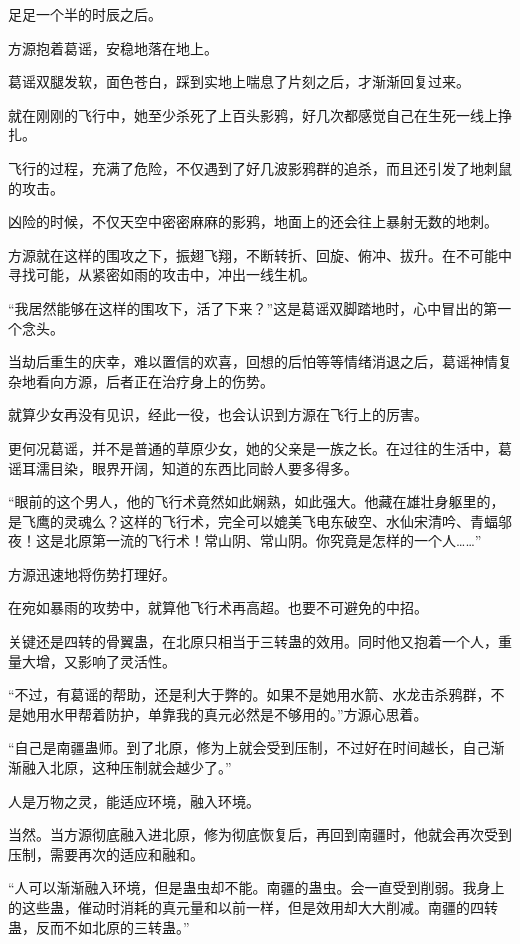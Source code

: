 
\begin{this_body}

足足一个半的时辰之后。

方源抱着葛谣，安稳地落在地上。

葛谣双腿发软，面色苍白，踩到实地上喘息了片刻之后，才渐渐回复过来。

就在刚刚的飞行中，她至少杀死了上百头影鸦，好几次都感觉自己在生死一线上挣扎。

飞行的过程，充满了危险，不仅遇到了好几波影鸦群的追杀，而且还引发了地刺鼠的攻击。

凶险的时候，不仅天空中密密麻麻的影鸦，地面上的还会往上暴射无数的地刺。

方源就在这样的围攻之下，振翅飞翔，不断转折、回旋、俯冲、拔升。在不可能中寻找可能，从紧密如雨的攻击中，冲出一线生机。

“我居然能够在这样的围攻下，活了下来？”这是葛谣双脚踏地时，心中冒出的第一个念头。

当劫后重生的庆幸，难以置信的欢喜，回想的后怕等等情绪消退之后，葛谣神情复杂地看向方源，后者正在治疗身上的伤势。

就算少女再没有见识，经此一役，也会认识到方源在飞行上的厉害。

更何况葛谣，并不是普通的草原少女，她的父亲是一族之长。在过往的生活中，葛谣耳濡目染，眼界开阔，知道的东西比同龄人要多得多。

“眼前的这个男人，他的飞行术竟然如此娴熟，如此强大。他藏在雄壮身躯里的，是飞鹰的灵魂么？这样的飞行术，完全可以媲美飞电东破空、水仙宋清吟、青蝠邬夜！这是北原第一流的飞行术！常山阴、常山阴。你究竟是怎样的一个人……”

方源迅速地将伤势打理好。

在宛如暴雨的攻势中，就算他飞行术再高超。也要不可避免的中招。

关键还是四转的骨翼蛊，在北原只相当于三转蛊的效用。同时他又抱着一个人，重量大增，又影响了灵活性。

“不过，有葛谣的帮助，还是利大于弊的。如果不是她用水箭、水龙击杀鸦群，不是她用水甲帮着防护，单靠我的真元必然是不够用的。”方源心思着。

“自己是南疆蛊师。到了北原，修为上就会受到压制，不过好在时间越长，自己渐渐融入北原，这种压制就会越少了。”

人是万物之灵，能适应环境，融入环境。

当然。当方源彻底融入进北原，修为彻底恢复后，再回到南疆时，他就会再次受到压制，需要再次的适应和融和。

“人可以渐渐融入环境，但是蛊虫却不能。南疆的蛊虫。会一直受到削弱。我身上的这些蛊，催动时消耗的真元量和以前一样，但是效用却大大削减。南疆的四转蛊，反而不如北原的三转蛊。”


\end{this_body}
